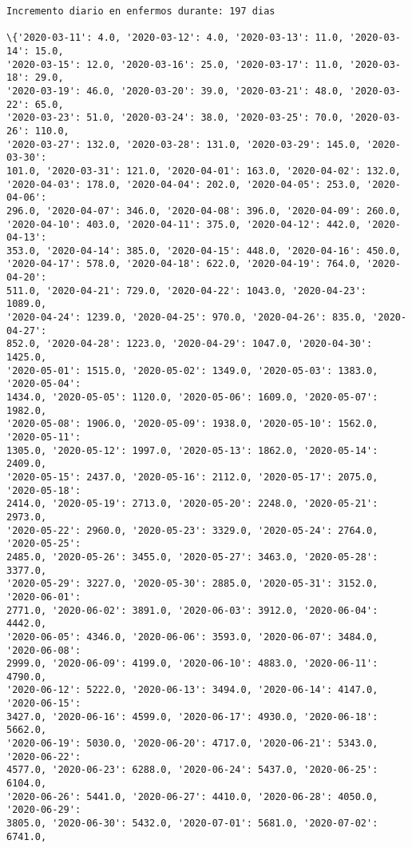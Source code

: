 \documentclass[11pt]{article}
\begin{document}
    \begin{Verbatim}[commandchars=\\\{\}]
Incremento diario en enfermos durante: 197 dias

\{'2020-03-11': 4.0, '2020-03-12': 4.0, '2020-03-13': 11.0, '2020-03-14': 15.0,
'2020-03-15': 12.0, '2020-03-16': 25.0, '2020-03-17': 11.0, '2020-03-18': 29.0,
'2020-03-19': 46.0, '2020-03-20': 39.0, '2020-03-21': 48.0, '2020-03-22': 65.0,
'2020-03-23': 51.0, '2020-03-24': 38.0, '2020-03-25': 70.0, '2020-03-26': 110.0,
'2020-03-27': 132.0, '2020-03-28': 131.0, '2020-03-29': 145.0, '2020-03-30':
101.0, '2020-03-31': 121.0, '2020-04-01': 163.0, '2020-04-02': 132.0,
'2020-04-03': 178.0, '2020-04-04': 202.0, '2020-04-05': 253.0, '2020-04-06':
296.0, '2020-04-07': 346.0, '2020-04-08': 396.0, '2020-04-09': 260.0,
'2020-04-10': 403.0, '2020-04-11': 375.0, '2020-04-12': 442.0, '2020-04-13':
353.0, '2020-04-14': 385.0, '2020-04-15': 448.0, '2020-04-16': 450.0,
'2020-04-17': 578.0, '2020-04-18': 622.0, '2020-04-19': 764.0, '2020-04-20':
511.0, '2020-04-21': 729.0, '2020-04-22': 1043.0, '2020-04-23': 1089.0,
'2020-04-24': 1239.0, '2020-04-25': 970.0, '2020-04-26': 835.0, '2020-04-27':
852.0, '2020-04-28': 1223.0, '2020-04-29': 1047.0, '2020-04-30': 1425.0,
'2020-05-01': 1515.0, '2020-05-02': 1349.0, '2020-05-03': 1383.0, '2020-05-04':
1434.0, '2020-05-05': 1120.0, '2020-05-06': 1609.0, '2020-05-07': 1982.0,
'2020-05-08': 1906.0, '2020-05-09': 1938.0, '2020-05-10': 1562.0, '2020-05-11':
1305.0, '2020-05-12': 1997.0, '2020-05-13': 1862.0, '2020-05-14': 2409.0,
'2020-05-15': 2437.0, '2020-05-16': 2112.0, '2020-05-17': 2075.0, '2020-05-18':
2414.0, '2020-05-19': 2713.0, '2020-05-20': 2248.0, '2020-05-21': 2973.0,
'2020-05-22': 2960.0, '2020-05-23': 3329.0, '2020-05-24': 2764.0, '2020-05-25':
2485.0, '2020-05-26': 3455.0, '2020-05-27': 3463.0, '2020-05-28': 3377.0,
'2020-05-29': 3227.0, '2020-05-30': 2885.0, '2020-05-31': 3152.0, '2020-06-01':
2771.0, '2020-06-02': 3891.0, '2020-06-03': 3912.0, '2020-06-04': 4442.0,
'2020-06-05': 4346.0, '2020-06-06': 3593.0, '2020-06-07': 3484.0, '2020-06-08':
2999.0, '2020-06-09': 4199.0, '2020-06-10': 4883.0, '2020-06-11': 4790.0,
'2020-06-12': 5222.0, '2020-06-13': 3494.0, '2020-06-14': 4147.0, '2020-06-15':
3427.0, '2020-06-16': 4599.0, '2020-06-17': 4930.0, '2020-06-18': 5662.0,
'2020-06-19': 5030.0, '2020-06-20': 4717.0, '2020-06-21': 5343.0, '2020-06-22':
4577.0, '2020-06-23': 6288.0, '2020-06-24': 5437.0, '2020-06-25': 6104.0,
'2020-06-26': 5441.0, '2020-06-27': 4410.0, '2020-06-28': 4050.0, '2020-06-29':
3805.0, '2020-06-30': 5432.0, '2020-07-01': 5681.0, '2020-07-02': 6741.0,

\end{Verbatim}
\end{document}
